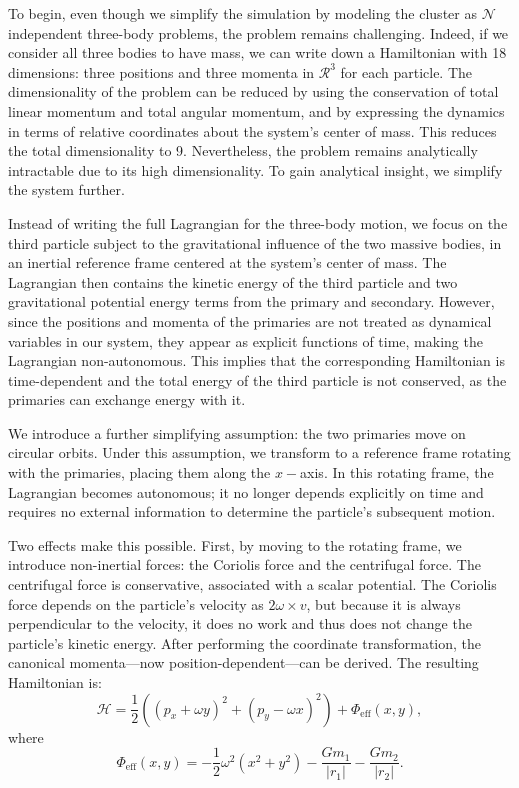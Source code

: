         To begin, even though we simplify the simulation by modeling the cluster as $\mathcal{N}$ independent three-body problems, the problem remains challenging. Indeed, if we consider all three bodies to have mass, we can write down a Hamiltonian with 18 dimensions: three positions and three momenta in $\mathcal{R}^3$ for each particle. The dimensionality of the problem can be reduced by using the conservation of total linear momentum and total angular momentum, and by expressing the dynamics in terms of relative coordinates about the system's center of mass. This reduces the total dimensionality to 9. Nevertheless, the problem remains analytically intractable due to its high dimensionality. To gain analytical insight, we simplify the system further.
        
        Instead of writing the full Lagrangian for the three-body motion, we focus on the third particle subject to the gravitational influence of the two massive bodies, in an inertial reference frame centered at the system's center of mass. The Lagrangian then contains the kinetic energy of the third particle and two gravitational potential energy terms from the primary and secondary. However, since the positions and momenta of the primaries are not treated as dynamical variables in our system, they appear as explicit functions of time, making the Lagrangian non-autonomous. This implies that the corresponding Hamiltonian is time-dependent and the total energy of the third particle is not conserved, as the primaries can exchange energy with it.

        We introduce a further simplifying assumption: the two primaries move on circular orbits. Under this assumption, we transform to a reference frame rotating with the primaries, placing them along the $x-$axis. In this rotating frame, the Lagrangian becomes autonomous; it no longer depends explicitly on time and requires no external information to determine the particle's subsequent motion.

        Two effects make this possible. First, by moving to the rotating frame, we introduce non-inertial forces: the Coriolis force and the centrifugal force. The centrifugal force is conservative, associated with a scalar potential. The Coriolis force depends on the particle's velocity as $2\omega\times v$, but because it is always perpendicular to the velocity, it does no work and thus does not change the particle's kinetic energy. After performing the coordinate transformation, the canonical momenta—now position-dependent—can be derived. The resulting Hamiltonian is:
        \begin{equation}
            \mathcal{H} = \frac{1}{2}\left(\left(p_x + \omega y\right)^2 + \left(p_y - \omega x\right)^2 \right) + \Phi_\mathrm{eff}(x,y),
        \end{equation}
        where
        \begin{equation}
            \Phi_\mathrm{eff}(x,y) = -\frac{1}{2} \omega^2 (x^2 + y^2) - \frac{G m_1}{|r_1|} - \frac{G m_2}{|r_2|}.
        \end{equation}

